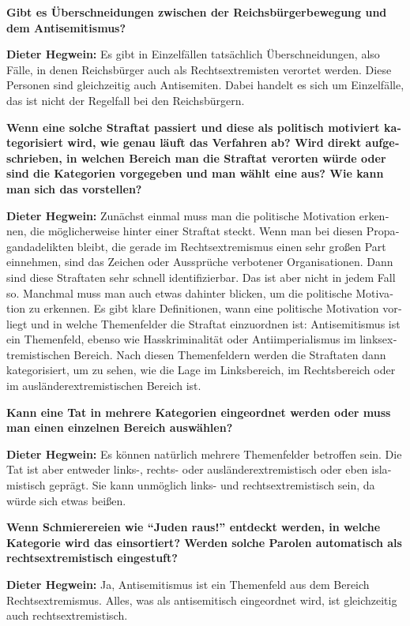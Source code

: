 \begin{otherlanguage}{ngerman}
\textbf{Gibt es Überschneidungen zwischen der Reichsbürgerbewegung und dem Antisemitismus?}

\sloppy
\textbf{Dieter Hegwein:} Es gibt in Einzelfällen tatsächlich Überschneidungen, also Fälle, in denen Reichsbürger auch als Rechtsextremisten verortet werden. Diese Personen sind gleichzeitig auch Antisemiten. Dabei handelt es sich um Einzelfälle, das ist nicht der Regelfall bei den Reichsbürgern.

\textbf{Wenn eine solche Straftat passiert und diese als politisch motiviert kategorisiert wird, wie genau läuft das Verfahren ab? Wird direkt aufgeschrieben, in welchen Bereich man die Straftat verorten würde oder sind die Kategorien vorgegeben und man wählt eine aus? Wie kann man sich das vorstellen?}

\textbf{Dieter Hegwein:} Zunächst einmal muss man die politische Motivation erkennen, die möglicherweise hinter einer Straftat steckt. Wenn man bei diesen Propagandadelikten bleibt, die gerade im Rechtsextremismus einen sehr großen Part einnehmen, sind das Zeichen oder Aussprüche verbotener Organisationen. Dann sind diese Straftaten sehr schnell identifizierbar. Das ist aber nicht in jedem Fall so. Manchmal muss man auch etwas dahinter blicken, um die politische Motivation zu erkennen. Es gibt klare Definitionen, wann eine politische Motivation vorliegt und in welche Themenfelder die Straftat einzuordnen ist: Antisemitismus ist ein Themenfeld, ebenso wie Hasskriminalität oder Antiimperialismus im linksextremistischen Bereich. Nach diesen Themenfeldern werden die Straftaten dann kategorisiert, um zu sehen, wie die Lage im Linksbereich, im Rechtsbereich oder im ausländerextremistischen Bereich ist.

\textbf{Kann eine Tat in mehrere Kategorien eingeordnet werden oder muss man einen einzelnen Bereich auswählen?} 

\textbf{Dieter Hegwein:} Es können natürlich mehrere Themenfelder betroffen sein. Die Tat ist aber entweder links-, rechts- oder ausländerextremistisch oder eben islamistisch geprägt. Sie kann unmöglich links- und rechtsextremistisch sein, da würde sich etwas beißen.

\textbf{Wenn Schmierereien wie "`Juden raus!"' entdeckt werden, in welche Kategorie wird das einsortiert? Werden solche Parolen automatisch als rechtsextremistisch eingestuft?}

\textbf{Dieter Hegwein:} Ja, Antisemitismus ist ein Themenfeld aus dem Bereich Rechtsextremismus. Alles, was als antisemitisch eingeordnet wird, ist gleichzeitig auch rechtsextremistisch.


\end{otherlanguage}
